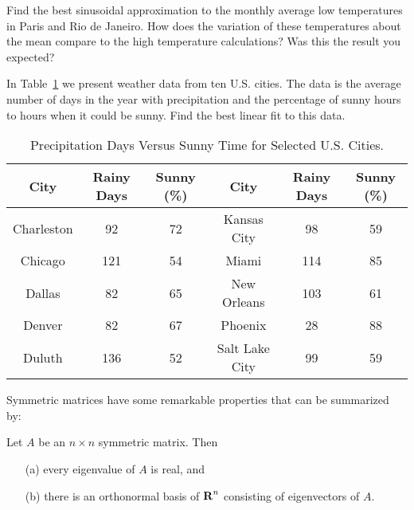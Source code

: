 \begin{exercise} \label{c7.6.2}
Find the best sinusoidal approximation to the monthly average low temperatures
in Paris and Rio de Janeiro.  How does the variation of these temperatures
about the mean compare to the high temperature calculations?  Was this the
result you expected?
\end{exercise}


\begin{exercise} \label{c7.6.3}
In Table~\ref{T:sunny} we present weather data from ten U.S. cities.  The
data is the average number of days in the year with precipitation and the
percentage of sunny hours to hours when it could be sunny.  Find the best
linear fit to this data.
\begin{table}[htb]
\begin{center}
\begin{tabular}{|c||c|c||c||c|c|}
\hline
City & Rainy Days & Sunny (\%) & City & Rainy Days & Sunny (\%)\\
\hline
Charleston 	&   92 & 72 & Kansas City 	&   98 & 59\\
Chicago 	&  121 & 54 & Miami 		&  114 & 85 \\
Dallas 		&   82 & 65 & New Orleans 	&  103 & 61 \\
Denver 		&   82 & 67 & Phoenix 		&   28 & 88 \\
Duluth 		&  136 & 52 & Salt Lake City 	&   99 & 59 \\
\hline
\end{tabular}
\caption{Precipitation Days Versus Sunny Time for Selected U.S. Cities.}
\label{T:sunny}
\end{center}
\end{table}
\end{exercise}


\label{S:symmetric}

Symmetric matrices have some remarkable properties that can be
summarized by:
\begin{thm}  \label{T:symmetricmat}
Let $A$ be an $n\times n$ symmetric matrix.
Then
\begin{enumerate}
\item[(a)] every eigenvalue
of $A$ is real, and
\item[(b)] there is an orthonormal basis
of $\mbox{$\bf{R}$}^n$ consisting of
	eigenvectors of $A$.
\end{enumerate}
\end{thm}

